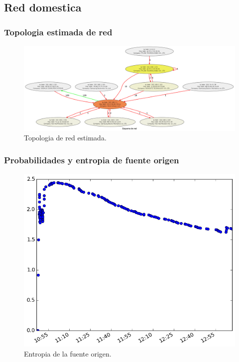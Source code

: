 \subsection{Red domestica}
\subsubsection{Topologia estimada de red}
\begin{figure}[h!]
  \centering	
	\includegraphics[scale=0.22]{../experimentacion-svilerino/casa/graph.png}
  \caption{Topologia de red estimada.}
\end{figure}


\subsubsection{Probabilidades y entropia de fuente origen}
\begin{figure}[h!]
  \centering
	\includegraphics[scale=0.66]{../experimentacion-svilerino/casa/entropy_src.png}
  \caption{Entropia de la fuente origen.}
\end{figure}

